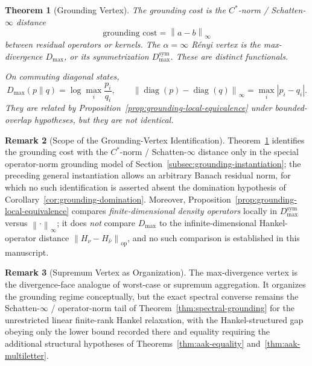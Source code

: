 \documentclass[12pt]{article}
\newtheorem{theorem}{Theorem}[section]
\theoremstyle{definition}
\newtheorem{remark}[theorem]{Remark}
\newcommand{\norm}[1]{\left\lVert#1\right\rVert}
\newcommand{\Dmax}{D_{\max}}
\newcommand{\Dmaxsym}{D_{\max}^{\mathrm{sym}}}
\begin{document}
\begin{theorem}[Grounding Vertex]
\label{thm:grounding-vertex}
The grounding cost is the $C^*$-norm / Schatten-$\infty$ distance
\[
\text{grounding cost}
=
\norm{a-b}_\infty
\]
between residual operators or kernels.  The $\alpha=\infty$ R\'enyi vertex is
the max-divergence $\Dmax$, or its symmetrization $\Dmaxsym$.  These are
distinct functionals.

On commuting diagonal states,
\[
\Dmax(p\|q)
=
\log\max_i\frac{p_i}{q_i},
\qquad
\norm{\operatorname{diag}(p)-\operatorname{diag}(q)}_\infty
=
\max_i|p_i-q_i|.
\]
They are related by Proposition~\ref{prop:grounding-local-equivalence} under
bounded-overlap hypotheses, but they are not identical.
\end{theorem}

\begin{remark}[Scope of the Grounding-Vertex Identification]
\label{rem:grounding-vertex-scope}
Theorem~\ref{thm:grounding-vertex} identifies the grounding cost with the
$C^*$-norm / Schatten-$\infty$ distance only in the special operator-norm
grounding model of Section~\ref{subsec:grounding-instantiation}; the
preceding general instantiation allows an arbitrary Banach residual norm, for
which no such identification is asserted absent the domination hypothesis of
Corollary~\ref{cor:grounding-domination}.  Moreover,
Proposition~\ref{prop:grounding-local-equivalence} compares
\emph{finite-dimensional density operators} locally in $\Dmaxsym$ versus
$\norm{\cdot}_\infty$; it does \emph{not} compare $\Dmax$ to the
infinite-dimensional Hankel-operator distance
$\norm{H_\nu-H_{\widehat\nu}}_{\mathrm{op}}$, and no such comparison is
established in this manuscript.
\end{remark}

\begin{remark}[Supremum Vertex as Organization]
\label{rem:grounding-supremum-organization}
The max-divergence vertex is the divergence-face analogue of worst-case or
supremum aggregation.  It organizes the grounding regime conceptually, but the
exact spectral converse remains the Schatten-$\infty$ / operator-norm tail of
Theorem~\ref{thm:spectral-grounding} for the unrestricted linear finite-rank
Hankel relaxation, with the Hankel-structured gap obeying only the lower bound
recorded there and equality requiring the additional structural hypotheses of
Theorems~\ref{thm:aak-equality} and~\ref{thm:aak-multiletter}.
\end{remark}

\end{document}

